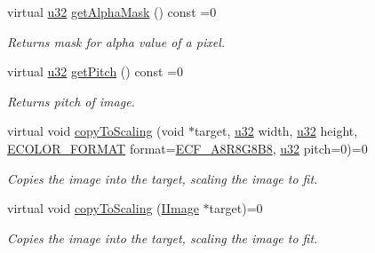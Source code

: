 \begin{DoxyCompactItemize}
\mbox{\label{classirr_1_1video_1_1IImage_a36d4f895245543080f24f99dd89930fb}} 
virtual \hyperlink{namespaceirr_a0416a53257075833e7002efd0a18e804}{u32} \hyperlink{classirr_1_1video_1_1IImage_a36d4f895245543080f24f99dd89930fb}{get\+Alpha\+Mask} () const =0
\begin{DoxyCompactList}\small\item\em Returns mask for alpha value of a pixel. \end{DoxyCompactList}\item 
\mbox{\label{classirr_1_1video_1_1IImage_aace497c2d12f217a795a546a735e2675}} 
virtual \hyperlink{namespaceirr_a0416a53257075833e7002efd0a18e804}{u32} \hyperlink{classirr_1_1video_1_1IImage_aace497c2d12f217a795a546a735e2675}{get\+Pitch} () const =0
\begin{DoxyCompactList}\small\item\em Returns pitch of image. \end{DoxyCompactList}\item 
\mbox{\label{classirr_1_1video_1_1IImage_a6f57153218f5ecd4da9aeb5a37f92f59}} 
virtual void \hyperlink{classirr_1_1video_1_1IImage_a6f57153218f5ecd4da9aeb5a37f92f59}{copy\+To\+Scaling} (void $\ast$target, \hyperlink{namespaceirr_a0416a53257075833e7002efd0a18e804}{u32} width, \hyperlink{namespaceirr_a0416a53257075833e7002efd0a18e804}{u32} height, \hyperlink{namespaceirr_1_1video_a1d5e487888c32b1674a8f75116d829ed}{E\+C\+O\+L\+O\+R\+\_\+\+F\+O\+R\+M\+AT} format=\hyperlink{namespaceirr_1_1video_a1d5e487888c32b1674a8f75116d829edac3d45e946a56d11bd43dc18661dfe7ec}{E\+C\+F\+\_\+\+A8\+R8\+G8\+B8}, \hyperlink{namespaceirr_a0416a53257075833e7002efd0a18e804}{u32} pitch=0)=0
\begin{DoxyCompactList}\small\item\em Copies the image into the target, scaling the image to fit. \end{DoxyCompactList}\item 
\mbox{\label{classirr_1_1video_1_1IImage_aa969bf7167171a18003e26ff7876febd}} 
virtual void \hyperlink{classirr_1_1video_1_1IImage_aa969bf7167171a18003e26ff7876febd}{copy\+To\+Scaling} (\hyperlink{classirr_1_1video_1_1IImage}{I\+Image} $\ast$target)=0
\begin{DoxyCompactList}\small\item\em Copies the image into the target, scaling the image to fit. \end{DoxyCompactList}\item 

\end{DoxyCompactItemize}

